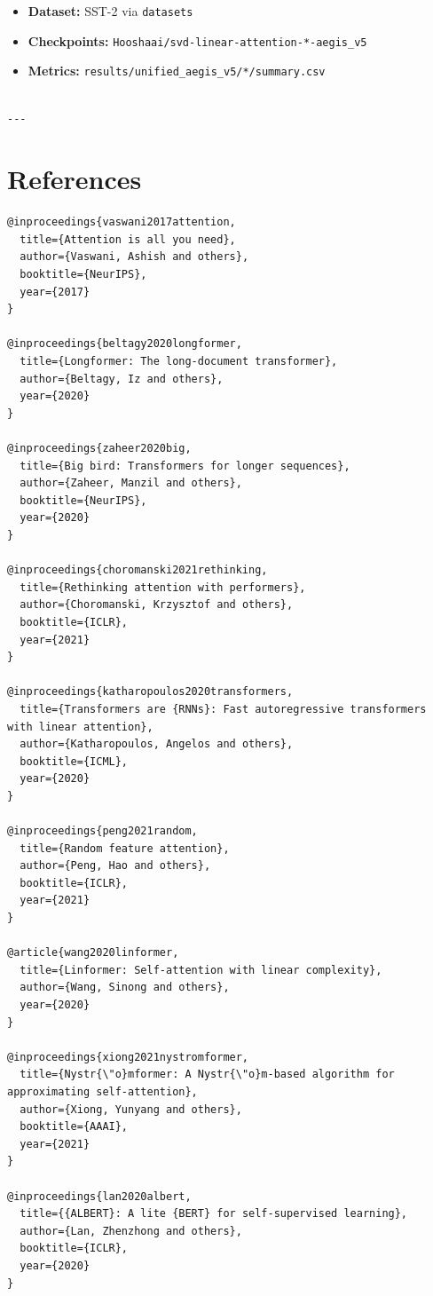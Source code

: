\begin{itemize}
\item \textbf{Dataset:} SST-2 via \texttt{datasets}
\item \textbf{Checkpoints:} \texttt{Hooshaai/svd-linear-attention-*-aegis\_v5}
\item \textbf{Metrics:} \texttt{results/unified\_aegis\_v5/*/summary.csv}
\end{itemize}
\begin{lstlisting}

---
\end{lstlisting}

\section{References}

\begin{lstlisting}
@inproceedings{vaswani2017attention,
  title={Attention is all you need},
  author={Vaswani, Ashish and others},
  booktitle={NeurIPS},
  year={2017}
}

@inproceedings{beltagy2020longformer,
  title={Longformer: The long-document transformer},
  author={Beltagy, Iz and others},
  year={2020}
}

@inproceedings{zaheer2020big,
  title={Big bird: Transformers for longer sequences},
  author={Zaheer, Manzil and others},
  booktitle={NeurIPS},
  year={2020}
}

@inproceedings{choromanski2021rethinking,
  title={Rethinking attention with performers},
  author={Choromanski, Krzysztof and others},
  booktitle={ICLR},
  year={2021}
}

@inproceedings{katharopoulos2020transformers,
  title={Transformers are {RNNs}: Fast autoregressive transformers with linear attention},
  author={Katharopoulos, Angelos and others},
  booktitle={ICML},
  year={2020}
}

@inproceedings{peng2021random,
  title={Random feature attention},
  author={Peng, Hao and others},
  booktitle={ICLR},
  year={2021}
}

@article{wang2020linformer,
  title={Linformer: Self-attention with linear complexity},
  author={Wang, Sinong and others},
  year={2020}
}

@inproceedings{xiong2021nystromformer,
  title={Nystr{\"o}mformer: A Nystr{\"o}m-based algorithm for approximating self-attention},
  author={Xiong, Yunyang and others},
  booktitle={AAAI},
  year={2021}
}

@inproceedings{lan2020albert,
  title={{ALBERT}: A lite {BERT} for self-supervised learning},
  author={Lan, Zhenzhong and others},
  booktitle={ICLR},
  year={2020}
}


\end{lstlisting}
